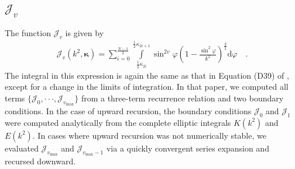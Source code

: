 \documentclass[modern]{aastex62}
\newcommand{\BS}[1]{\ensuremath{\pmb{#1}}}
\newcommand{\dd}{\ensuremath{\text{d}}}
\newcommand{\bkappa}{\BS{\kappa}}
\newcommand{\vmax}{{v_\text{max}}}
\newcommand{\kapint}[1]{%
\sum_{i = 0}^{\frac{N - 1}{2}}
\int\limits_{\frac{1}{2}\kappa_{2i}}^{\frac{1}{2}\kappa_{2i+1}}
#1
\dd\varphi
}
\begin{document}
\subsection{$\mathcal{J}_v$}
%
The function $\mathcal{J}_v$ is given by
%
\begin{align}
    \label{eq:J}
    \mathcal{J}_v(k^2, \bkappa) =
    \kapint{
        \sin^{2v}\varphi
        \left(1 - \frac{\sin^2\varphi}{k^2}\right)^\frac{3}{2}
    }
    \quad.
\end{align}
%
The integral in this expression is again the same as that in Equation (D39)
of \citet{Luger2019}, except for a change in the limits of integration.
In that paper, we computed all terms
$\{ \mathcal{J}_0, {\cdot\cdot\cdot}, \mathcal{J}_\vmax \}$ from a three-term
recurrence relation and two boundary conditions. In the case of upward
recursion, the boundary conditions $\mathcal{J}_0$ and $\mathcal{J}_1$ were
computed analytically from the complete elliptic integrals $K(k^2)$
and $E(k^2)$. In cases where upward recursion was not numerically stable, we
evaluated $\mathcal{J}_\vmax$ and $\mathcal{J}_{\vmax-1}$
via a quickly convergent series expansion and recursed downward.
\end{document}
